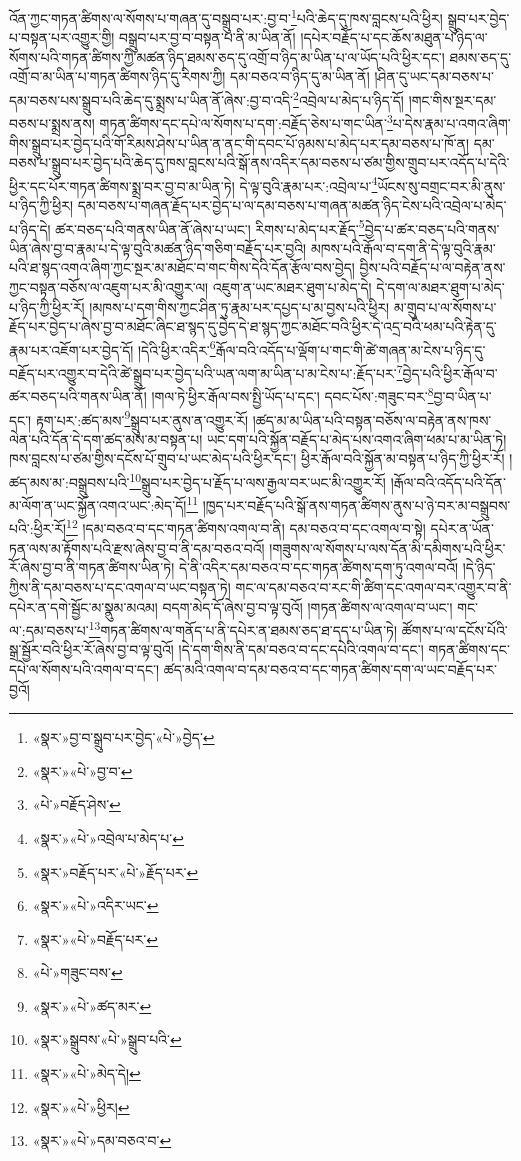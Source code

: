 འོན་ཀྱང་གཏན་ཚིགས་ལ་སོགས་པ་གཞན་དུ་བསྒྲུབ་པར་:བྱ་བ་\footnote{«སྣར་»བྱ་བ་སྒྲུབ་པར་བྱེད་«པེ་»བྱེད་}པའི་ཆེད་དུ་ཁས་བླངས་པའི་ཕྱིར། སྒྲུབ་པར་བྱེད་པ་བསྟན་པར་འགྱུར་གྱི། བསྒྲུབ་པར་བྱ་བ་བསྟན་པ་ནི་མ་ཡིན་ནོ། །དཔེར་བརྗོད་པ་དང་ཆོས་མཐུན་པ་ཉིད་ལ་སོགས་པའི་གཏན་ཚིགས་ཀྱི་མཚན་ཉིད་ཐམས་ཅད་དུ་འགྲོ་བ་ཉིད་མ་ཡིན་པ་ལ་ཡོད་པའི་ཕྱིར་དང་། ཐམས་ཅད་དུ་འགྲོ་བ་མ་ཡིན་པ་གཏན་ཚིགས་ཉིད་དུ་རིགས་ཀྱི། དམ་བཅའ་བ་ཉིད་དུ་མ་ཡིན་ནོ། །ཤིན་དུ་ཡང་དམ་བཅས་པ་དམ་བཅས་པས་སྒྲུབ་པའི་ཆེད་དུ་སྨྲས་པ་ཡིན་ནོ་ཞེས་:བྱ་བ་འདི་\footnote{«སྣར་»«པེ་»བྱ་བ་}འབྲེལ་པ་མེད་པ་ཉིད་དོ། །གང་གིས་སྔར་དམ་བཅས་པ་སྨྲས་ནས། གཏན་ཚིགས་དང་དཔེ་ལ་སོགས་པ་དག་:བརྗོད་ཅེས་པ་གང་ཡིན་\footnote{«པེ་»བརྗོད་ཤེས་}པ་དེས་རྣམ་པ་འགའ་ཞིག་གིས་སྒྲུབ་པར་བྱེད་པའི་གོ་རིམས་ཤེས་པ་ཡིན་ན་ནང་གི་དབང་པོ་ཉམས་པ་མེད་པར་དམ་བཅས་པ་ཁོ་ན། དམ་བཅས་པ་སྒྲུབ་པར་བྱེད་པའི་ཆེད་དུ་ཁས་བླངས་པའི་སྒོ་ནས་འདིར་དམ་བཅས་པ་ཙམ་གྱིས་གྲུབ་པར་འདོད་པ་དེའི་ཕྱིར་དང་པོར་གཏན་ཚིགས་སྨྲ་བར་བྱ་བ་མ་ཡིན་ཏེ། དེ་ལྟ་བུའི་རྣམ་པར་:འབྲེལ་པ་\footnote{«སྣར་»«པེ་»འབྲེལ་པ་མེད་པ་}ཡོངས་སུ་བགྲང་བར་མི་ནུས་པ་ཉིད་ཀྱི་ཕྱིར། དམ་བཅས་པ་གཞན་རྗོད་པར་བྱེད་པ་ལ་དམ་བཅས་པ་གཞན་མཚན་ཉིད་ངེས་པའི་འབྲེལ་པ་མེད་པ་ཉིད་དེ། ཚར་བཅད་པའི་གནས་ཡིན་ནོ་ཞེས་པ་ཡང་། རིགས་པ་མེད་པར་རྗོད་\footnote{«སྣར་»བརྗོད་པར་«པེ་»རྗོད་པར་}བྱེད་པ་ཚར་བཅད་པའི་གནས་ཡིན་ཞེས་བྱ་བ་རྣམ་པ་དེ་ལྟ་བུའི་མཚན་ཉིད་གཅིག་བརྗོད་པར་བྱའི། མཁས་པའི་རྒོལ་བ་དག་ནི་དེ་ལྟ་བུའི་རྣམ་པའི་ཐ་སྙད་འགའ་ཞིག་ཀྱང་སྔར་མ་མཐོང་བ་གང་གིས་དེའི་དོན་རྩོལ་བས་བྱེད། བྱིས་པའི་བརྗོད་པ་ལ་བརྟེན་ནས་ཀྱང་བསྟན་བཅོས་ལ་འཇུག་པར་མི་འགྱུར་ལ། འཇུག་ན་ཡང་མཐར་ཐུག་པ་མེད་དེ། དེ་དག་ལ་མཐར་ཐུག་པ་མེད་པ་ཉིད་ཀྱི་ཕྱིར་རོ། །མཁས་པ་དག་གིས་ཀྱང་ཤིན་ཏུ་རྣམ་པར་དཔྱད་པ་མ་བྱས་པའི་ཕྱིར། མ་གྲུབ་པ་ལ་སོགས་པ་རྗོད་པར་བྱེད་པ་ཞེས་བྱ་བ་མཐོང་ཞིང་ཐ་སྙད་དུ་བྱེད་དེ་ཐ་སྙད་ཀྱང་མཐོང་བའི་ཕྱིར་དེ་འདྲ་བའི་ཕམ་པའི་རྟེན་དུ་རྣམ་པར་འཇོག་པར་བྱེད་དོ། །དེའི་ཕྱིར་འདིར་\footnote{«སྣར་»«པེ་»འདིར་ཡང་}རྒོལ་བའི་འདོད་པ་ལྡོག་པ་གང་གི་ཚེ་གཞན་མ་ངེས་པ་ཉིད་དུ་བརྗོད་པར་འགྱུར་བ་དེའི་ཚེ་སྒྲུབ་པར་བྱེད་པའི་ཡན་ལག་མ་ཡིན་པ་མ་ངེས་པ་:རྗོད་པར་\footnote{«སྣར་»«པེ་»བརྗོད་པར་}བྱེད་པའི་ཕྱིར་རྒོལ་བ་ཚར་བཅད་པའི་གནས་ཡིན་ནོ། །གལ་ཏེ་ཕྱིར་རྒོལ་བས་སྤྱི་ཡོད་པ་དང་། དབང་པོས་:གཟུང་བར་\footnote{«པེ་»གཟུང་བས་}བྱ་བ་ཡིན་པ་དང་། རྟག་པར་:ཚད་མས་\footnote{«སྣར་»«པེ་»ཚད་མར་}སྒྲུབ་པར་ནུས་ན་འགྱུར་རོ། །ཚད་མ་མ་ཡིན་པའི་བསྟན་བཅོས་ལ་བརྟེན་ནས་ཁས་ལེན་པའི་དོན་དེ་དག་ཚད་མས་མ་བསྟན་པ། ཡང་དག་པའི་སྐྱོན་བརྗོད་པ་མེད་པས་འགའ་ཞིག་ཕམ་པ་མ་ཡིན་ཏེ། ཁས་བླངས་པ་ཙམ་གྱིས་དངོས་པོ་གྲུབ་པ་ཡང་མེད་པའི་ཕྱིར་དང་། ཕྱིར་རྒོལ་བའི་སྐྱོན་མ་བསྟན་པ་ཉིད་ཀྱི་ཕྱིར་རོ། །ཚད་མས་མ་:བསྒྲུབས་པའི་\footnote{«སྣར་»སྒྲུབས་«པེ་»སྒྲུབ་པའི་}སྒྲུབ་པར་བྱེད་པ་རྗོད་པ་ལས་རྒྱལ་བར་ཡང་མི་འགྱུར་རོ། །རྒོལ་བའི་འདོད་པའི་དོན་མ་ལོག་ན་ཡང་སྐྱོན་འགའ་ཡང་:མེད་དོ།\footnote{«སྣར་»«པེ་»མེད་དེ།} །ཁྱད་པར་བརྗོད་པའི་སྒོ་ནས་གཏན་ཚིགས་ནུས་པ་ཉེ་བར་མ་བསྒྲུབས་པའི་:ཕྱིར་རོ།\footnote{«སྣར་»«པེ་»ཕྱིར།} །དམ་བཅའ་བ་དང་གཏན་ཚིགས་འགལ་བ་ནི། དམ་བཅའ་བ་དང་འགལ་བ་སྟེ། དཔེར་ན་ཡོན་ཏན་ལས་མ་རྟོགས་པའི་རྫས་ཞེས་བྱ་བ་ནི་དམ་བཅའ་བའོ། །གཟུགས་ལ་སོགས་པ་ལས་དོན་མི་དམིགས་པའི་ཕྱིར་རོ་ཞེས་བྱ་བ་ནི་གཏན་ཚིགས་ཡིན་ཏེ། དེ་ནི་འདིར་དམ་བཅའ་བ་དང་གཏན་ཚིགས་དག་ཏུ་འགལ་བའོ། །དེ་ཉིད་ཀྱིས་ནི་དམ་བཅས་པ་དང་འགལ་བ་ཡང་བསྟན་ཏེ། གང་ལ་དམ་བཅའ་བ་རང་གི་ཚིག་དང་འགལ་བར་འགྱུར་བ་ནི་དཔེར་ན་དགེ་སྦྱོང་མ་སྣུམ་མའམ། བདག་མེད་དོ་ཞེས་བྱ་བ་ལྟ་བུའོ། །གཏན་ཚིགས་ལ་འགལ་བ་ཡང་། གང་ལ་:དམ་བཅས་པ་\footnote{«སྣར་»«པེ་»དམ་བཅའ་བ་}གཏན་ཚིགས་ལ་གནོད་པ་ནི་དཔེར་ན་ཐམས་ཅད་ཐ་དད་པ་ཡིན་ཏེ། ཚོགས་པ་ལ་དངོས་པོའི་སྒྲ་སྦྱོར་བའི་ཕྱིར་རོ་ཞེས་བྱ་བ་ལྟ་བུའོ། །དེ་དག་གིས་ནི་དམ་བཅའ་བ་དང་དཔེའི་འགལ་བ་དང་། གཏན་ཚིགས་དང་དཔེ་ལ་སོགས་པའི་འགལ་བ་དང་། ཚད་མའི་འགལ་བ་དམ་བཅའ་བ་དང་གཏན་ཚིགས་དག་ལ་ཡང་བརྗོད་པར་བྱའོ། 
